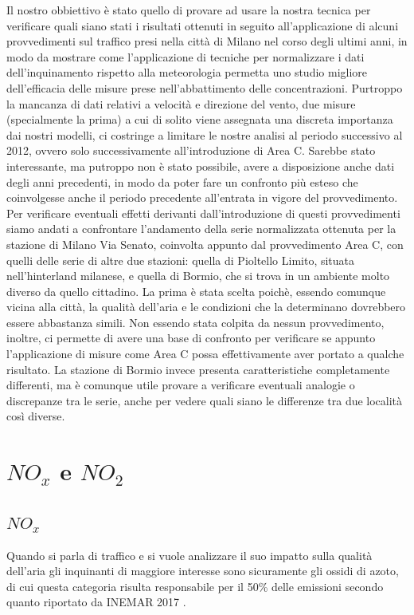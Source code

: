\documentclass[a4paper,12pt]{report}
\begin{document}
Il nostro obbiettivo è stato quello di provare ad usare la nostra tecnica per verificare quali siano stati i risultati ottenuti in seguito all'applicazione di alcuni provvedimenti sul traffico presi nella città di Milano nel corso degli ultimi anni, in modo da mostrare come l'applicazione di tecniche per normalizzare i dati dell'inquinamento rispetto alla meteorologia permetta uno studio migliore dell'efficacia delle misure prese nell'abbattimento delle concentrazioni. Purtroppo la mancanza di dati relativi a velocità e direzione del vento, due misure (specialmente la prima) a cui di solito viene assegnata una discreta importanza dai nostri modelli, ci costringe a limitare le nostre analisi al periodo successivo al 2012, ovvero solo successivamente all'introduzione di Area C. Sarebbe stato interessante, ma putroppo non è stato possibile, avere a disposizione anche dati degli anni precedenti, in modo da poter fare un confronto più esteso che coinvolgesse anche il periodo precedente all'entrata in vigore del provvedimento.
Per verificare eventuali effetti derivanti dall'introduzione di questi provvedimenti siamo andati a confrontare l'andamento della serie normalizzata ottenuta per la stazione di Milano Via Senato, coinvolta appunto dal provvedimento Area C, con quelli delle serie di altre due stazioni: quella di Pioltello Limito, situata nell'hinterland milanese, e quella di Bormio, che si trova in un ambiente molto diverso da quello cittadino. La prima è stata scelta poichè, essendo comunque vicina alla città, la qualità dell'aria e le condizioni che la determinano dovrebbero essere abbastanza simili. Non essendo stata colpita da nessun provvedimento, inoltre, ci permette di avere una base di confronto per verificare se appunto l'applicazione di misure come Area C possa effettivamente aver portato a qualche risultato. La stazione di Bormio invece presenta caratteristiche completamente differenti, ma è comunque utile provare a verificare eventuali analogie o discrepanze tra le serie, anche per vedere quali siano le differenze tra due località così diverse.

\section{$NO_x$ e $NO_2$}
\subsection{$NO_x$}
Quando si parla di traffico e si vuole analizzare il suo impatto sulla qualità dell'aria gli inquinanti di maggiore interesse sono sicuramente gli ossidi di azoto, di cui questa categoria risulta responsabile per il 50\% delle emissioni secondo quanto riportato da INEMAR 2017 \cite{inemar2017}.
\end{document}
